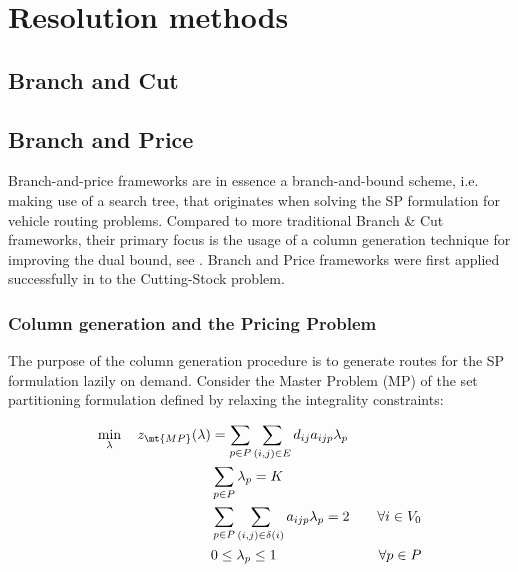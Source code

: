 \section{Resolution methods}
\label{sec:intro-resolution-methods}

\subsection{Branch and Cut}
\label{sec:intro-branch-and-cut}

\subsection{Branch and Price}
\label{sec:intro-branch-and-price}

Branch-and-price frameworks are in essence a branch-and-bound scheme, i.e. making use of a search tree, that originates when solving the SP formulation for vehicle routing problems.
Compared to more traditional Branch \& Cut frameworks, their primary focus is the usage of a column generation technique for improving the dual bound, see \textcite{righini2008new}.
Branch and Price frameworks were first applied successfully in \textcite{gilmore_linear_1961} to the Cutting-Stock problem.

\subsubsection{Column generation and the Pricing Problem}
\label{sec:column-generation-and-pricing-problem}

The purpose of the column generation procedure is to generate routes for the SP formulation lazily on demand.
Consider the Master Problem (MP) of the set partitioning formulation defined by relaxing the integrality constraints:

\begin{align}
	\min_{\lambda} \quad z_\mt{MP}(\lambda) & = \sum_{p \in P} \sum_{(i, j) \in E} d_{ij} a_{ijp} \lambda_p \label{eq:mp-obj-func}                                                                                                                             \\
	                                        & \sum_{p \in P} \lambda_{p} = K                                                       & \label{eq:mp-K-routes}                                                                                                    \\
	                                        & \sum_{p \in P} \sum_{(i, j) \in \delta(i)} a_{ijp} \lambda_p = 2                     & \quad \forall i \in V_0                                              \label{eq:mp-customers-visited-by-exactly-one-route} \\
	                                        & 0 \le \lambda_p \le 1                                                                & \quad \forall p \in P \label{eq:mp-lambda-mip-var-bounds}
\end{align}


